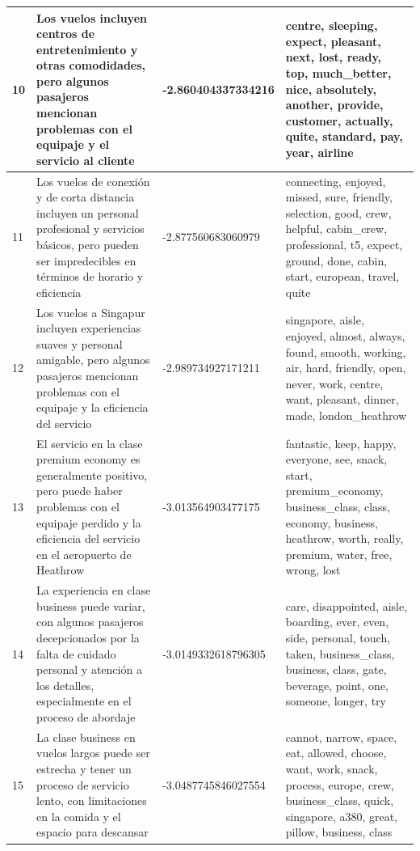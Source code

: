 \documentclass{report}
\begin{document}
{\begin{longtable}{|p{1cm}|p{4cm}|p{4cm}|p{6cm}|}
                    \hline
                    10 & Los vuelos incluyen centros de entretenimiento y otras comodidades, pero algunos pasajeros mencionan problemas con el equipaje y el servicio al cliente & -2.860404337334216 & centre, sleeping, expect, pleasant, next, lost, ready, top, much\_better, nice, absolutely, another, provide, customer, actually, quite, standard, pay, year, airline \\
                    \hline
                    11 & Los vuelos de conexión y de corta distancia incluyen un personal profesional y servicios básicos, pero pueden ser impredecibles en términos de horario y eficiencia & -2.877560683060979 & connecting, enjoyed, missed, sure, friendly, selection, good, crew, helpful, cabin\_crew, professional, t5, expect, ground, done, cabin, start, european, travel, quite \\
                    \hline
                    12 & Los vuelos a Singapur incluyen experiencias suaves y personal amigable, pero algunos pasajeros mencionan problemas con el equipaje y la eficiencia del servicio & -2.989734927171211 & singapore, aisle, enjoyed, almost, always, found, smooth, working, air, hard, friendly, open, never, work, centre, want, pleasant, dinner, made, london\_heathrow \\
                    \hline
                    13 & El servicio en la clase premium economy es generalmente positivo, pero puede haber problemas con el equipaje perdido y la eficiencia del servicio en el aeropuerto de Heathrow & -3.013564903477175 & fantastic, keep, happy, everyone, see, snack, start, premium\_economy, business\_class, class, economy, business, heathrow, worth, really, premium, water, free, wrong, lost \\
                    \hline
                    14 & La experiencia en clase business puede variar, con algunos pasajeros decepcionados por la falta de cuidado personal y atención a los detalles, especialmente en el proceso de abordaje & -3.0149332618796305 & care, disappointed, aisle, boarding, ever, even, side, personal, touch, taken, business\_class, business, class, gate, beverage, point, one, someone, longer, try \\
                    \hline
                    15 & La clase business en vuelos largos puede ser estrecha y tener un proceso de servicio lento, con limitaciones en la comida y el espacio para descansar & -3.0487745846027554 & cannot, narrow, space, eat, allowed, choose, want, work, snack, process, europe, crew, business\_class, quick, singapore, a380, great, pillow, business, class \\

\end{longtable}}
\end{document}
